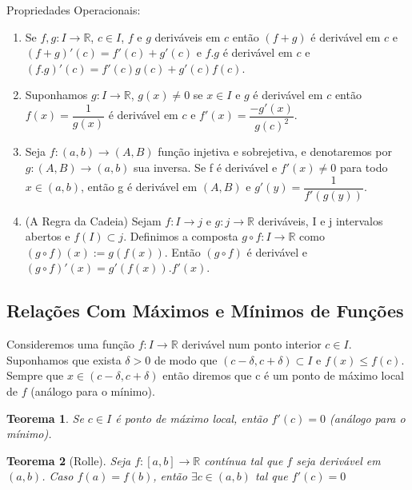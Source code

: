 \documentclass[12pt]{article}
\newtheorem{theorem}{Teorema}[section]
\begin{document}
Propriedades Operacionais:
\begin{enumerate}
    \item Se $f, g : I \rightarrow{} \mathbb{R}$, $c \in I$, $f$ e $g$ deriváveis em $c$ então $(f+g)$ é derivável em $c$ e $(f+g)'(c) = f'(c) + g'(c)$ e $f . g$ é derivável em $c$ e $(f . g)'(c) = f'(c) g(c) + g'(c) f(c)$.
    
    \item Suponhamos $g: I \rightarrow{} \mathbb{R}$, $g(x) \neq 0$ se $x \in I$ e $g$ é derivável em $c$ então $f(x) = \dfrac{1}{g(x)}$ é derivável em $c$ e $f'(x) = \dfrac{- g'(x)}{g(c)^2}$.
    
    \item Seja $f: (a, b) \rightarrow{} (A, B)$ função injetiva e sobrejetiva, e denotaremos por $g: (A, B) \rightarrow{} (a, b)$ sua inversa. Se f é derivável e $f'(x) \neq 0$ para todo $x \in (a, b)$, então g é derivável em $(A, B)$ e $g'(y) = \dfrac{1}{f'(g(y))}$.
    
    \item (A Regra da Cadeia) Sejam $f: I \rightarrow{} j$ e $g: j \rightarrow{} \mathbb{R}$ deriváveis, I e j intervalos abertos e $f(I) \subset j$. Definimos a composta $g \circ f: I \rightarrow{} \mathbb{R}$ como $(g \circ f)(x):=g(f(x))$. Então $(g \circ f)$ é derivável e $(g \circ f)'(x) = g'(f(x)).f'(x)$.
\end{enumerate}

\subsection{Relações Com Máximos e Mínimos de Funções}
\label{s4}

Consideremos uma função $f: I \rightarrow{} \mathbb{R}$ derivável num ponto interior $c \in I$. Suponhamos que exista $\delta > 0$ de modo que $(c - \delta, c + \delta) \subset I$ e $f(x) \leq f(c)$. Sempre que $x \in (c - \delta, c + \delta)$ então diremos que c é um ponto de máximo local de $f$ (análogo para o mínimo).

\begin{theorem}
    Se $c \in I$ é ponto de máximo local, então $f'(c) = 0$ (análogo para o mínimo).
\end{theorem}

\begin{theorem}[Rolle] Seja $f: [a, b] \rightarrow{} \mathbb{R}$ contínua tal que $f$ seja derivável em $(a, b)$. Caso $f(a) = f(b)$, então $\exists c \in (a, b)$ tal que $f'(c) = 0$
\end{theorem}
\end{document}
